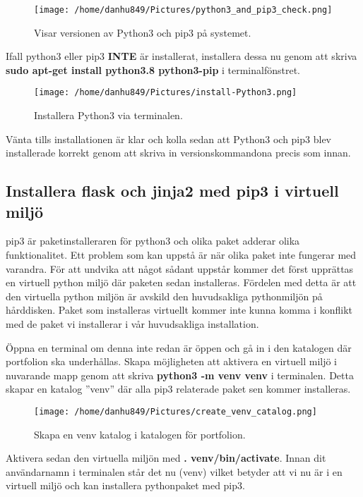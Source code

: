 \documentclass{TDP003mall}
\begin{document}
\begin{figure}[h]
  \centerline{\texttt{[image: /home/danhu849/Pictures/python3\_and\_pip3\_check.png]}}
  \caption{Visar versionen av Python3 och pip3 på systemet.}
  \label{fig}
\end{figure}

Ifall python3 eller pip3 \textbf{INTE} är installerat, installera dessa nu genom att skriva \newline\textbf{sudo apt-get install python3.8 python3-pip} i terminalfönstret.

\begin{figure}[h]
  \centerline{\texttt{[image: /home/danhu849/Pictures/install-Python3.png]}}
  \caption{Installera Python3 via terminalen.}
  \label{fig}
\end{figure}

Vänta tills installationen är klar och kolla sedan att Python3 och pip3 blev installerade korrekt genom att skriva in versionskommandona precis som innan.

\subsection{Installera flask och jinja2 med pip3 i virtuell miljö}
pip3 är paketinstalleraren för python3 och olika paket adderar olika funktionalitet. Ett problem som kan uppstå är när olika paket inte fungerar med varandra. För att undvika att något sådant uppstår kommer det först upprättas en virtuell python miljö där paketen sedan installeras. Fördelen med detta är att den virtuella python miljön är avskild den huvudsakliga pythonmiljön på hårddisken. Paket som installeras virtuellt kommer inte kunna komma i konflikt med de paket vi installerar i vår huvudsakliga installation.

Öppna en terminal om denna inte redan är öppen och gå in i den katalogen där portfolion ska underhållas. Skapa möjligheten att aktivera en virtuell miljö i nuvarande mapp genom att skriva \newline\textbf{python3 -m venv venv} i terminalen. Detta skapar en katalog ''venv'' där alla pip3 relaterade paket sen kommer installeras. 

\begin{figure}[h]
  \centerline{\texttt{[image: /home/danhu849/Pictures/create\_venv\_catalog.png]}}
  \caption{Skapa en venv katalog i katalogen för portfolion.}
  \label{fig}
\end{figure}

Aktivera sedan den virtuella miljön med \textbf{. venv/bin/activate}. Innan dit användarnamn i terminalen står det nu (venv) vilket betyder att vi nu är i en virtuell miljö och kan installera pythonpaket med pip3.
\end{document}
